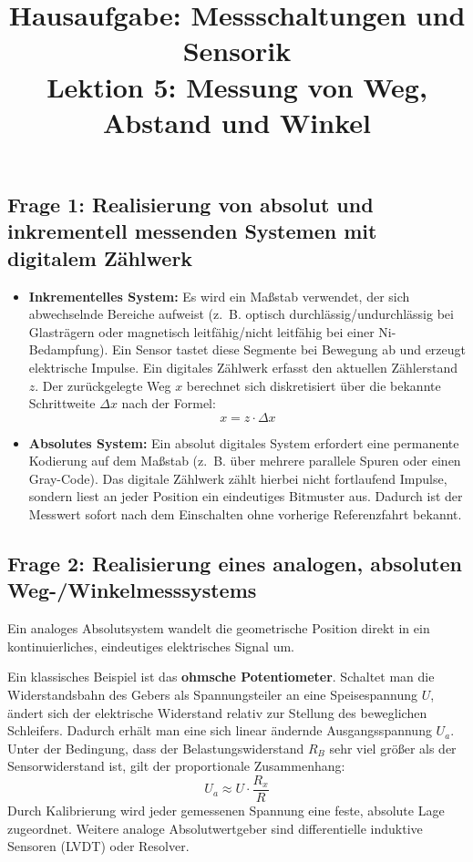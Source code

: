 \documentclass[12pt,a4paper]{article}
\title{Hausaufgabe: Messschaltungen und Sensorik\\Lektion 5: Messung von Weg, Abstand und Winkel}
\author{}
\date{}
\begin{document}
\maketitle

\subsection*{Frage 1: Realisierung von absolut und inkrementell messenden Systemen mit digitalem Zählwerk}

\begin{itemize}
    \item \textbf{Inkrementelles System:} Es wird ein Maßstab verwendet, der sich abwechselnde Bereiche aufweist (z.~B. optisch durchlässig/undurchlässig bei Glasträgern oder magnetisch leitfähig/nicht leitfähig bei einer Ni-Bedampfung). Ein Sensor tastet diese Segmente bei Bewegung ab und erzeugt elektrische Impulse. Ein digitales Zählwerk erfasst den aktuellen Zählerstand $z$. Der zurückgelegte Weg $x$ berechnet sich diskretisiert über die bekannte Schrittweite $\Delta x$ nach der Formel:
    \begin{equation}
        x = z \cdot \Delta x
    \end{equation}
    \item \textbf{Absolutes System:} Ein absolut digitales System erfordert eine permanente Kodierung auf dem Maßstab (z.~B. über mehrere parallele Spuren oder einen Gray-Code). Das digitale Zählwerk zählt hierbei nicht fortlaufend Impulse, sondern liest an jeder Position ein eindeutiges Bitmuster aus. Dadurch ist der Messwert sofort nach dem Einschalten ohne vorherige Referenzfahrt bekannt.
\end{itemize}

\subsection*{Frage 2: Realisierung eines analogen, absoluten Weg-/Winkelmesssystems}

Ein analoges Absolutsystem wandelt die geometrische Position direkt in ein kontinuierliches, eindeutiges elektrisches Signal um. 

Ein klassisches Beispiel ist das \textbf{ohmsche Potentiometer}. Schaltet man die Widerstandsbahn des Gebers als Spannungsteiler an eine Speisespannung $U$, ändert sich der elektrische Widerstand relativ zur Stellung des beweglichen Schleifers. Dadurch erhält man eine sich linear ändernde Ausgangsspannung $U_a$. Unter der Bedingung, dass der Belastungswiderstand $R_B$ sehr viel größer als der Sensorwiderstand ist, gilt der proportionale Zusammenhang:
\begin{equation}
    U_a \approx U \cdot \frac{R_x}{R}
\end{equation}
Durch Kalibrierung wird jeder gemessenen Spannung eine feste, absolute Lage zugeordnet. Weitere analoge Absolutwertgeber sind differentielle induktive Sensoren (LVDT) oder Resolver.
\end{document}
